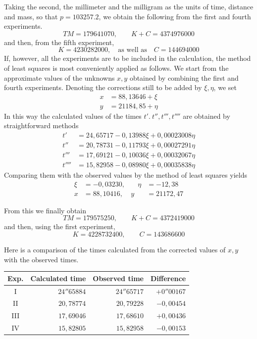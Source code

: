 Taking the second, the millimeter and the milligram as the units of time, distance and mass, so that $p=103257.2$, we obtain the following from the first and fourth experiments.
\[
TM=179641070,\qquad K+C=4374976000
\]
and then, from the fifth experiment,
\[
K=4230282000,\quad \text{as well as}\quad C=144694000
\]
If, however, all the experiments are to be included in the calculation, the method of least squares is most conveniently applied as follows. We start from the approximate values of the unknowns $x,y$ obtained by combining the first and fourth experiments. Denoting the corrections still to be added by $\xi,\eta$, we set
\[
\begin{aligned}
x&=88{,}13646+\xi\\
y&=21184{,}85+\eta
\end{aligned}
\]
In this way the calculated values of the times $t'.\ t'',t''',t''''$ are obtained by straightforward methods
\[
\begin{aligned}
t'&=24{,}65717-0{,}13988\xi+0{,}00023008\eta\\
t''&=20{,}78731-0{,}11793\xi+0{,}00027291\eta\\
t'''&=17{,}69121-0{,}10036\xi+0{,}00032067\eta\\
t''''&=15{,}82958-0{,}08980\xi+0{,}00035838\eta
\end{aligned}
\]
Comparing them with the observed values by the method of least squares yields
\[
\begin{aligned}
\xi&=-0{,}03230,&\quad\eta&=-12{,}38\\
x&=88{,}10416,&y&=21172{,}47
\end{aligned}
\]

From this we finally obtain
\[
TM=179575250,\qquad K+C=4372419000
\]
and then, using the first experiment,
\[
K=4228732400,\qquad C=143686600
\]

Here is a comparison of the times calculated from the corrected values of $x,y$ with the observed times.
\begin{center}
\begin{tabular}{c|r|r|r}
Exp.&Calculated time&Observed time&Difference\\\hline
I&$24''65884$&$24''65717$&$+0''00167$\\
II&$20{,}78774$&$20{,}79228$&$-0{,}00454$\\
III&$17{,}69046$&$17{,}68610$&$+0{,}00436$\\
IV&$15{,}82805$&$15{,}82958$&$-0{,}00153$
\end{tabular}
\end{center}

